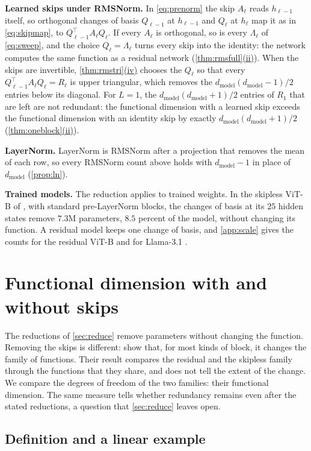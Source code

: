 \documentclass[10pt]{article}
\theoremstyle{definition}
\theoremstyle{remark}
\newcommand{\dm}{d_{\mathrm{model}}}
\newcommand{\para}[1]{\smallskip\noindent\textbf{#1}\hspace{0.5em}}
\DeclareRobustCommand{\cpref}[2]{\hyperref[#1:#2]{\cref*{#1}(#2)}}
\begin{document}
\para{Learned skips under RMSNorm.} In \eqref{eq:prenorm} the skip $A_\ell$ reads $h_{\ell-1}$ itself, so orthogonal changes of basis $Q_{\ell-1}$ at $h_{\ell-1}$ and $Q_\ell$ at $h_\ell$ map it as in \eqref{eq:skipmap}, to $Q_{\ell-1}^\top A_\ell Q_\ell$. If every $A_\ell$ is orthogonal, so is every $\Lambda_\ell$ of \eqref{eq:sweep}, and the choice $Q_\ell = \Lambda_\ell$ turns every skip into the identity: the network computes the same function as a residual network (\cpref{thm:rmsfull}{ii}). When the skips are invertible, \cpref{thm:rmstri}{iv} chooses the $Q_\ell$ so that every $Q_{\ell-1}^\top A_\ell Q_\ell = R_\ell$ is upper triangular, which removes the $\dm(\dm-1)/2$ entries below its diagonal. For $L = 1$, the $\dm(\dm+1)/2$ entries of $R_1$ that are left are not redundant: the functional dimension with a learned skip exceeds the functional dimension with an identity skip by exactly $\dm(\dm+1)/2$ (\cpref{thm:oneblock}{ii}).

\para{LayerNorm.} LayerNorm is RMSNorm after a projection that removes the mean of each row, so every RMSNorm count above holds with $\dm - 1$ in place of $\dm$ (\cref{prop:ln}).

\para{Trained models.}\label{sec:trained} The reduction applies to trained weights. In the skipless ViT-B \citep{dosovitskiy2021an} of \citet{ji2026cutting}, with standard pre-LayerNorm blocks, the changes of basis at its $25$ hidden states remove $7.3$M parameters, $8.5$ percent of the model, without changing its function. A residual model keeps one change of basis, and \cref{app:scale} gives the counts for the residual ViT-B and for Llama-3.1 \citep{grattafiori2024llama3}.

\section{Functional dimension with and without skips}\label{sec:gain}
The reductions of \cref{sec:reduce} remove parameters without changing the function. Removing the skips is different: \citet{mijoski2026worth} show that, for most kinds of block, it changes the family of functions. Their result compares the residual and the skipless family through the functions that they share, and does not tell the extent of the change. We compare the degrees of freedom of the two families: their functional dimension. The same measure tells whether redundancy remains even after the stated reductions, a question that \cref{sec:reduce} leaves open.

\subsection{Definition and a linear example}\label{sec:fd}
\end{document}
